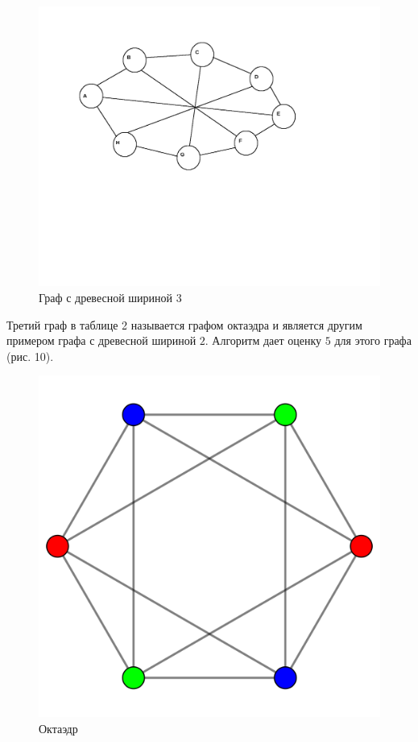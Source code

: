 \documentclass[a4paper,12pt]{article}
\begin{document}
\begin{large}
\begin{large}
		\begin{figure}[htbp]
			\centering
				\includegraphics[scale=0.2]{graph_example_cross_out.png}
				\caption{Граф с древесной шириной 3}
				\label{fig:testImage}
		\end{figure}

		Третий граф в таблице 2 называется графом октаэдра и является другим примером графа с древесной шириной $2$. Алгоритм дает оценку $5$ для этого графа (рис. 10).

		\begin{figure}[htbp]
			\centering
				\includegraphics[scale=0.1]{octahedron.png}
				\caption{Октаэдр}
				\label{fig:testImage}
		\end{figure}


\end{large}
\end{large}
\end{document}
